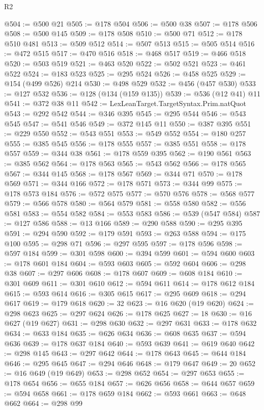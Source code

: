 \begin{lexlean}{R2}
\begin{coremodule}
@504 := @500 @21
@505 := @178 @504
@506 := @500 @38
@507 := @178 @506
@508 := @500 @145
@509 := @178 @508
@510 := @500 @71
@512 := @178 @510 @481
@513 := @509 @512
@514 := @507 @513
@515 := @505 @514
@516 := @472 @515
@517 := @470 @516
@518 := @468 @517
@519 := @466 @518
@520 := @503 @519
@521 := @463 @520
@522 := @502 @521
@523 := @461 @522
@524 := @183 @523
@525 := @295 @524
@526 := @458 @525
@529 := @154 (@499 @526) @214
@530 := @498 @529
@532 := @456 (@457 @530)
@533 := @127 @532
@536 := @128 (@134 (@159 @135))
@539 := @536 (@12 @41) @11
@541 := @372 @38 @11
@542 := LexLeanTarget.TargetSyntax.Prim.natQuot
@543 := @292 @542
@544 := @346 @395
@545 := @295 @544
@546 := @543 @545
@547 := @541 @546
@549 := @372 @145 @11
@550 := @387 @395
@551 := @229 @550
@552 := @543 @551
@553 := @549 @552
@554 := @180 @257
@555 := @385 @545
@556 := @178 @555
@557 := @385 @551
@558 := @178 @557
@559 := @344 @38
@561 := @178 @559 @395
@562 := @190 @561
@563 := @385 @562
@564 := @178 @563
@565 := @543 @562
@566 := @178 @565
@567 := @344 @145
@568 := @178 @567
@569 := @344 @71
@570 := @178 @569
@571 := @344 @166
@572 := @178 @571
@573 := @344 @99
@575 := @178 @573 @184
@576 := @572 @575
@577 := @570 @576
@578 := @568 @577
@579 := @566 @578
@580 := @564 @579
@581 := @558 @580
@582 := @556 @581
@583 := @554 @582
@584 := @553 @583
@586 := @539 (@547 @584)
@587 := @127 @586
@588 := @13 @166
@589 := @290 @588
@590 := @295 @395
@591 := @294 @590
@592 := @179 @591
@593 := @263 @588
@594 := @175 @100
@595 := @298 @71
@596 := @297 @595
@597 := @178 @596
@598 := @597 @184
@599 := @301 @598
@600 := @394 @599
@601 := @594 @600
@603 := @178 @601 @184
@604 := @593 @603
@605 := @592 @604
@606 := @298 @38
@607 := @297 @606
@608 := @178 @607
@609 := @608 @184
@610 := @301 @609
@611 := @301 @610
@612 := @594 @611
@614 := @178 @612 @184
@615 := @593 @614
@616 := @305 @615
@617 := @295 @609
@618 := @294 @617
@619 := @179 @618
@620 := 32
@623 := @16 @620 (@19 @620)
@624 := @298 @623
@625 := @297 @624
@626 := @178 @625
@627 := 18
@630 := @16 @627 (@19 @627)
@631 := @298 @630
@632 := @297 @631
@633 := @178 @632
@634 := @633 @184
@635 := @626 @634
@636 := @608 @635
@637 := @594 @636
@639 := @178 @637 @184
@640 := @593 @639
@641 := @619 @640
@642 := @298 @145
@643 := @297 @642
@644 := @178 @643
@645 := @644 @184
@646 := @295 @645
@647 := @294 @646
@648 := @179 @647
@649 := 20
@652 := @16 @649 (@19 @649)
@653 := @298 @652
@654 := @297 @653
@655 := @178 @654
@656 := @655 @184
@657 := @626 @656
@658 := @644 @657
@659 := @594 @658
@661 := @178 @659 @184
@662 := @593 @661
@663 := @648 @662
@664 := @298 @99

\end{coremodule}
\end{lexlean}
